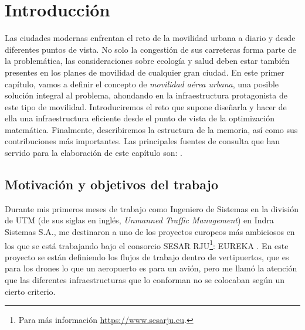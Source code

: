 \documentclass[12pt,a4paper]{book}
\begin{document}
\newpage
\tableofcontents

\newpage
\clearpage
{}
\chapter{Introducción} \label{Capitulo 1}
Las ciudades modernas enfrentan el reto de la movilidad urbana a diario y desde diferentes puntos de vista. No solo la congestión de sus carreteras forma parte de la problemática, las consideraciones sobre ecología y salud deben estar también presentes en los planes de movilidad de cualquier gran ciudad. En este primer capítulo, vamos a definir el concepto de \textsl{movilidad aérea urbana}, una posible solución integral al problema, ahondando en la infraestructura protagonista de este tipo de movilidad. Introduciremos el reto que supone diseñarla y hacer de ella una infraestructura eficiente desde el punto de vista de la optimización matemática. Finalmente, describiremos la estructura de la memoria, así como sus contribuciones más importantes. Las principales fuentes de consulta que han servido para la elaboración de este capítulo son: \cite{espejo-diaz_heuristic_2023, gupta_two-stage_1988, levitt_uam_2021, park_vertiport_2022}.       

\section{Motivación y objetivos del trabajo} \label{Sec:1_1}
Durante mis primeros meses de trabajo como Ingeniero de Sistemas en la división de UTM (de sus siglas en inglés, \textsl{Unmanned Traffic Management}) en Indra Sistemas S.A., me destinaron a uno de los proyectos europeos más ambiciosos en los que se está trabajando bajo el consorcio SESAR RJU\footnote{Para más información \url{https://www.sesarju.eu}.}: EUREKA \cite{proyEUREKA}. En este proyecto se están definiendo los flujos de trabajo dentro de vertipuertos, que es para los drones lo que un aeropuerto es para un avión, pero me llamó la atención que las diferentes infraestructuras que lo conforman no se colocaban según un cierto criterio. 
\end{document}
